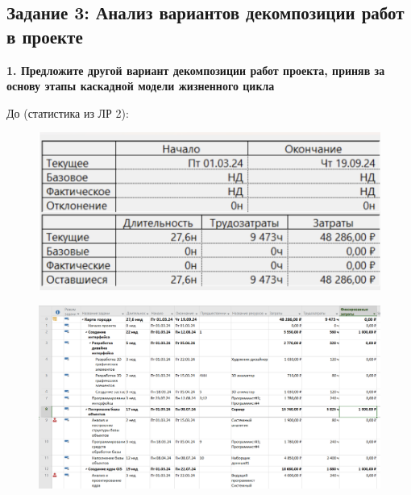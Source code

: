 \subsection*{Задание 3: Анализ вариантов декомпозиции работ в проекте}

\textbf{1. Предложите другой вариант декомпозиции работ проекта, приняв за
основу этапы каскадной модели жизненного цикла}

До (статистика из ЛР 2):
\begin{figure}[h!]
	\begin{center}
		\includegraphics[scale=0.6]{inc/img/p_9.png}
	\end{center}
	\captionsetup{justification=centering}
	\label{fig:u3}
\end{figure}

\begin{figure}[h!]
	\begin{center}
		\includegraphics[scale=0.55]{inc/img/p_10.png}
	\end{center}
	\captionsetup{justification=centering}
	\label{fig:u3}
\end{figure}

